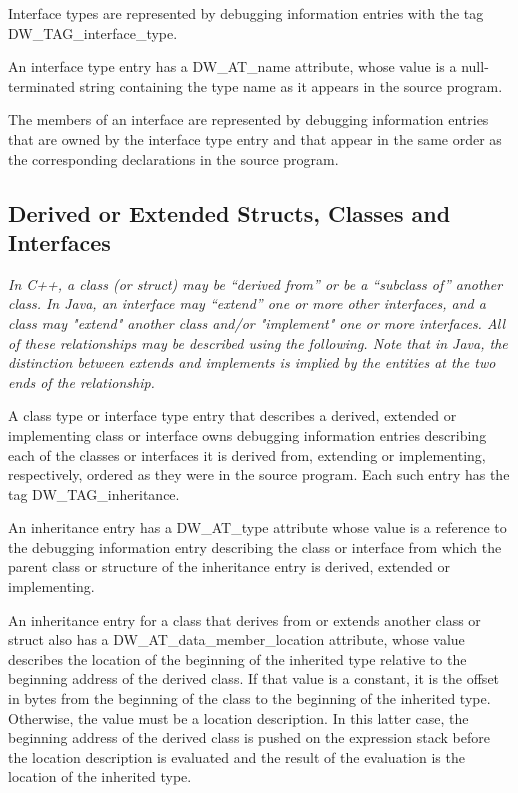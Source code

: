Interface types are represented by debugging information
entries with the tag DW\_TAG\_interface\_type.

An interface type entry has a DW\_AT\_name attribute, whose
value is a null-terminated string containing the type name
as it appears in the source program.

The members of an interface are represented by debugging
information entries that are owned by the interface type
entry and that appear in the same order as the corresponding
declarations in the source program.

\subsection{Derived or Extended Structs, Classes and Interfaces}
\label{chap:derivedorextendedstructsclasesandinterfaces}

\textit{In C++, a class (or struct) may be ``derived from'' or be a
``subclass of'' another class. In Java, an interface may ``extend''
one or more other interfaces, and a class may "extend" another
class and/or "implement" one or more interfaces. All of these
relationships may be described using the following. Note that
in Java, the distinction between extends and implements is
implied by the entities at the two ends of the relationship.}

A class type or interface type entry that describes a
derived, extended or implementing class or interface owns
debugging information entries describing each of the classes
or interfaces it is derived from, extending or implementing,
respectively, ordered as they were in the source program. Each
such entry has the tag DW\_TAG\_inheritance.

An inheritance entry has a DW\_AT\_type attribute whose value is
a reference to the debugging information entry describing the
class or interface from which the parent class or structure
of the inheritance entry is derived, extended or implementing.

An inheritance entry for a class that derives from or extends
another class or struct also has a DW\_AT\_data\_member\_location
attribute, whose value describes the location of the beginning
of the inherited type relative to the beginning address of the
derived class. If that value is a constant, it is the offset
in bytes from the beginning of the class to the beginning of
the inherited type. Otherwise, the value must be a location
description. In this latter case, the beginning address of
the derived class is pushed on the expression stack before
the location description is evaluated and the result of the
evaluation is the location of the inherited type.

